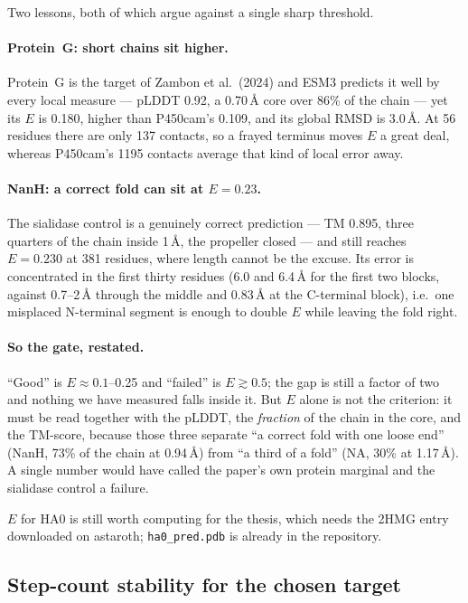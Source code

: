 \documentclass[11pt,a4paper]{article}
\newcommand{\file}[1]{\texttt{#1}}
\begin{document}
Two lessons, both of which argue against a single sharp threshold.

\paragraph{Protein~G: short chains sit higher.} Protein~G is the target of Zambon
et al.\ (2024) and ESM3 predicts it well by every local measure --- pLDDT 0.92, a
0.70\,\AA{} core over 86\% of the chain --- yet its $E$ is 0.180, higher than
P450cam's 0.109, and its global RMSD is 3.0\,\AA. At 56 residues there are only
137 contacts, so a frayed terminus moves $E$ a great deal, whereas P450cam's 1195
contacts average that kind of local error away.

\paragraph{NanH: a correct fold can sit at $E=0.23$.} The sialidase control is a
genuinely correct prediction --- TM 0.895, three quarters of the chain inside
1\,\AA, the propeller closed --- and still reaches $E = 0.230$ at 381 residues,
where length cannot be the excuse. Its error is concentrated in the first thirty
residues (6.0 and 6.4\,\AA{} for the first two blocks, against 0.7--2\,\AA{}
through the middle and 0.83\,\AA{} at the C-terminal block), i.e.\ one misplaced
N-terminal segment is enough to double $E$ while leaving the fold right.

\paragraph{So the gate, restated.} ``Good'' is $E \approx 0.1$--0.25 and ``failed''
is $E \gtrsim 0.5$; the gap is still a factor of two and nothing we have measured
falls inside it. But $E$ alone is not the criterion: it must be read together
with the pLDDT, the \emph{fraction} of the chain in the core, and the TM-score,
because those three separate ``a correct fold with one loose end'' (NanH, 73\% of
the chain at 0.94\,\AA) from ``a third of a fold'' (NA, 30\% at 1.17\,\AA). A
single number would have called the paper's own protein marginal and the sialidase
control a failure.

$E$ for HA0 is still worth computing for the thesis, which needs the 2HMG entry
downloaded on astaroth; \file{ha0\_pred.pdb} is already in the repository.

\subsection{Step-count stability for the chosen target}\label{sec:p450-steps}
\end{document}
